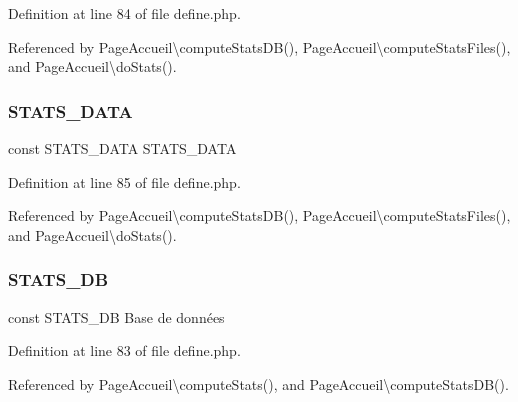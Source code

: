 Definition at line 84 of file define.\+php.



Referenced by Page\+Accueil\textbackslash{}compute\+Stats\+D\+B(), Page\+Accueil\textbackslash{}compute\+Stats\+Files(), and Page\+Accueil\textbackslash{}do\+Stats().

\mbox{\label{application_2src_2define_8php_a8eff94f12dc70df1a51e15bbb1ea5e1f}} 
\subsubsection{\texorpdfstring{S\+T\+A\+T\+S\+\_\+\+D\+A\+TA}{STATS\_DATA}}
{\footnotesize\ttfamily const S\+T\+A\+T\+S\+\_\+\+D\+A\+TA \textquotesingle{}S\+T\+A\+T\+S\+\_\+\+D\+A\+TA\textquotesingle{}}



Definition at line 85 of file define.\+php.



Referenced by Page\+Accueil\textbackslash{}compute\+Stats\+D\+B(), Page\+Accueil\textbackslash{}compute\+Stats\+Files(), and Page\+Accueil\textbackslash{}do\+Stats().

\mbox{\label{application_2src_2define_8php_afbaef20bcc8e1291fe3dfe18ee913408}} 
\subsubsection{\texorpdfstring{S\+T\+A\+T\+S\+\_\+\+DB}{STATS\_DB}}
{\footnotesize\ttfamily const S\+T\+A\+T\+S\+\_\+\+DB \textquotesingle{}Base de données\textquotesingle{}}



Definition at line 83 of file define.\+php.



Referenced by Page\+Accueil\textbackslash{}compute\+Stats(), and Page\+Accueil\textbackslash{}compute\+Stats\+D\+B().

